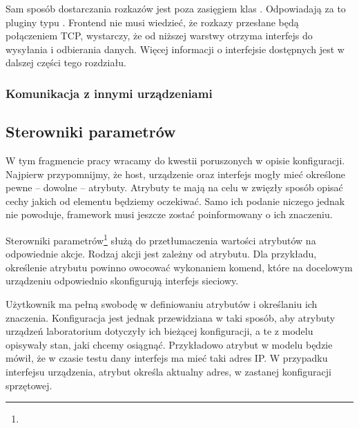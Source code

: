 \documentclass[00-praca-magisterska.tex]{subfiles}
\begin{document}
Sam sposób dostarczania rozkazów jest poza zasięgiem klas .
Odpowiadają za to pluginy typu . Frontend nie musi
wiedzieć, że rozkazy przesłane będą połączeniem TCP, wystarczy, że od niższej
warstwy otrzyma interfejs do wysyłania i odbierania danych. Więcej informacji o
interfejsie  dostępnych jest w dalszej części tego
rozdziału.



\subsubsection{Komunikacja z innymi urządzeniami}

\FIXME{}

\subsection{Sterowniki parametrów}

W tym fragmencie pracy wracamy do kwestii poruszonych w opisie konfiguracji.
Najpierw przypomnijmy, że host, urządzenie oraz interfejs mogły mieć określone
pewne -- dowolne -- atrybuty. Atrybuty te mają na celu w zwięzły sposób opisać
cechy jakich od elementu będziemy oczekiwać. Samo ich podanie niczego jednak nie
powoduje, framework musi jeszcze zostać poinformowany o ich znaczeniu.

Sterowniki parametrów\footnote{} służą do przetłumaczenia
wartości atrybutów na odpowiednie akcje. Rodzaj akcji jest zależny od atrybutu.
Dla przykładu, określenie atrybutu  powinno owocować wykonaniem komend,
które na docelowym urządzeniu odpowiednio skonfigurują interfejs sieciowy.

Użytkownik ma pełną swobodę w definiowaniu atrybutów i określaniu ich
znaczenia. Konfiguracja jest jednak przewidziana w taki sposób, aby atrybuty
urządzeń laboratorium dotyczyły ich bieżącej konfiguracji, a te z modelu
opisywały stan, jaki chcemy osiągnąć. Przykładowo atrybut  w modelu
będzie mówił, że w czasie testu dany interfejs ma mieć taki adres IP. W
przypadku interfejsu urządzenia, atrybut  określa aktualny adres, w
zastanej konfiguracji sprzętowej.
\end{document}
